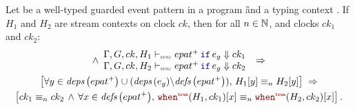 \begin{lemma}
    \label{lem:semantics:grsync:theorems:determinism:epat}
    Let  be a well-typed guarded event pattern in a program \G and a typing
    context \tyCtx. If $H_1$ and $H_2$ are stream contexts on clock $ck$, then for all
    $n \in \mathbb{N}$, and clocks $ck_1$ and $ck_2$:
    \begin{multline*}
        \wedge \begin{array}{l}
            \epatDenot{H_1}{ck}{\guarded{epat^+}{e_g}}{ck_1} \\
            \epatDenot{H_2}{ck}{\guarded{epat^+}{e_g}}{ck_2}
        \end{array}
        \; \Rightarrow \\
        \left[
        \forall y \in \deps{epat^+} \cup (\deps{e_g} \backslash \defs{epat^+}), \, H_1[y] \equiv_n H_2[y]
        \right]
        \; \Rightarrow \\
        \left[
            ck_1 \equiv_n ck_2 \, \wedge \, \forall x \in \defs{epat^+}, \, \whenT{H_1}{ck_1}
            [x] \equiv_n \whenT{H_2}{ck_2}[x]
            \right].
    \end{multline*}
\end{lemma}
